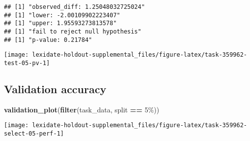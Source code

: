 \documentclass[
]{book}
\newenvironment{Shaded}{\begin{snugshade}}{\end{snugshade}}
\newcommand{\AttributeTok}[1]{\textcolor[rgb]{0.13,0.29,0.53}{#1}}
\newcommand{\DecValTok}[1]{\textcolor[rgb]{0.00,0.00,0.81}{#1}}
\newcommand{\FunctionTok}[1]{\textcolor[rgb]{0.13,0.29,0.53}{\textbf{#1}}}
\newcommand{\NormalTok}[1]{#1}
\newcommand{\OtherTok}[1]{\textcolor[rgb]{0.56,0.35,0.01}{#1}}
\newcommand{\SpecialCharTok}[1]{\textcolor[rgb]{0.81,0.36,0.00}{\textbf{#1}}}
\newcommand{\StringTok}[1]{\textcolor[rgb]{0.31,0.60,0.02}{#1}}
\begin{document}
\begin{Shaded}
\end{Shaded}

\begin{verbatim}
## [1] "observed_diff: 1.25048032725024"
## [1] "lower: -2.00109902223407"
## [1] "upper: 1.95593273813578"
## [1] "fail to reject null hypothesis"
## [1] "p-value: 0.21784"
\end{verbatim}

\texttt{[image: lexidate-holdout-supplemental\_files/figure-latex/task-359962-test-05-pv-1]}

\hypertarget{validation-accuracy-55}{%
\subsection{Validation accuracy}\label{validation-accuracy-55}}

\begin{Shaded}
\begin{Highlighting}[]
\FunctionTok{validation\_plot}\NormalTok{(}\FunctionTok{filter}\NormalTok{(task\_data, split }\SpecialCharTok{==} \StringTok{\textquotesingle{}5\%\textquotesingle{}}\NormalTok{))}
\end{Highlighting}
\end{Shaded}

\texttt{[image: lexidate-holdout-supplemental\_files/figure-latex/task-359962-select-05-perf-1]}
\end{document}
